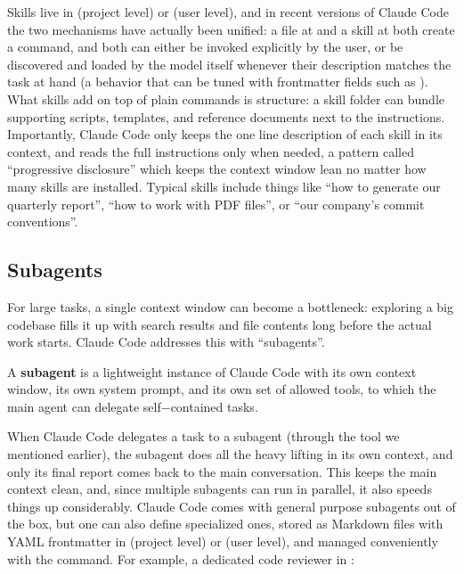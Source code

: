 Skills live in  (project level) or  (user level), and in recent
versions of Claude Code the two mechanisms have actually been unified: a file at 
and a skill at  both create a  command, and both can either be
invoked explicitly by the user, or be discovered and loaded by the model itself whenever their description matches
the task at hand (a behavior that can be tuned with frontmatter fields such as
). What skills add on top of plain commands is structure: a skill folder can
bundle supporting scripts, templates, and reference documents next to the instructions. Importantly, Claude Code only
keeps the one line description of each skill in its context, and reads the full instructions only when needed, a
pattern called ``progressive disclosure'' which keeps the context window lean no matter how many skills are
installed. Typical skills include things like ``how to generate our quarterly report'', ``how to work with PDF
files'', or ``our company's commit conventions''.

\subsection{Subagents}

For large tasks, a single context window can become a bottleneck: exploring a big codebase fills it up with search
results and file contents long before the actual work starts. Claude Code addresses this with ``subagents''.

\bd[Subagent]
A \textbf{subagent} is a lightweight instance of Claude Code with its own context window, its own system prompt, and
its own set of allowed tools, to which the main agent can delegate self$-$contained tasks.
\ed

When Claude Code delegates a task to a subagent (through the  tool we mentioned earlier), the subagent
does all the heavy lifting in its own context, and only its final report comes back to the main conversation. This
keeps the main context clean, and, since multiple subagents can run in parallel, it also speeds things up
considerably. Claude Code comes with general purpose subagents out of the box, but one can also define specialized
ones, stored as Markdown files with YAML frontmatter in  (project level) or
 (user level), and managed conveniently with the  command. For example, a
dedicated code reviewer in :

